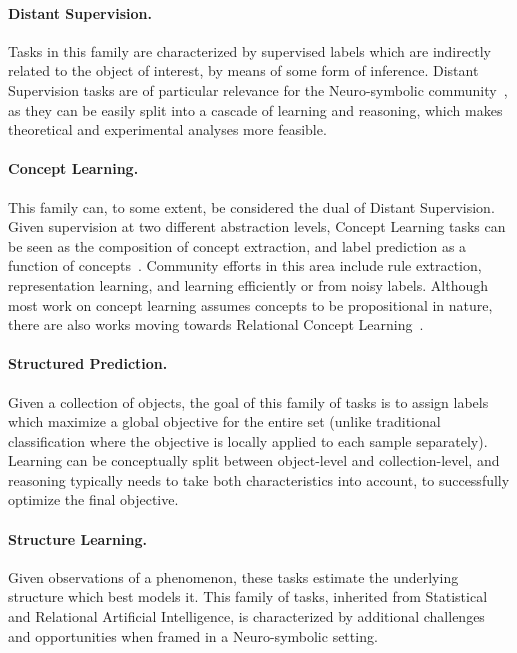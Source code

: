 \paragraph{Distant Supervision.} Tasks in this family are characterized by supervised labels which are indirectly related to the object of interest, by means of some form of inference. Distant Supervision tasks are of particular relevance for the Neuro-symbolic community~\cite{marra2024statistical}, as they can be easily split into a cascade of learning and reasoning, which makes theoretical and experimental analyses more feasible. %

\paragraph{Concept Learning.} This family can, to some extent, be considered the dual of Distant Supervision. Given supervision at two different abstraction levels, Concept Learning tasks can be seen as the composition of concept extraction, and label prediction as a function of concepts~\cite{koh2020concept}. Community efforts in this area include rule extraction, representation learning, and learning efficiently or from noisy labels. Although most work on concept learning assumes concepts to be propositional in nature, there are also works moving towards Relational Concept Learning~\cite{barbiero2023relational}.

\paragraph{Structured Prediction.} Given a collection of objects, the goal of this family of tasks is to assign labels which maximize a global objective for the entire set (unlike traditional classification where the objective is locally applied to each sample separately). Learning can be conceptually split between object-level and collection-level, and reasoning typically needs to take both characteristics into account, to successfully optimize the final objective.%

\paragraph{Structure Learning.} Given observations of a phenomenon, these tasks estimate the underlying structure which best models it. This family of tasks, inherited from Statistical and Relational Artificial Intelligence, is characterized by additional challenges and opportunities when framed in a Neuro-symbolic setting.

